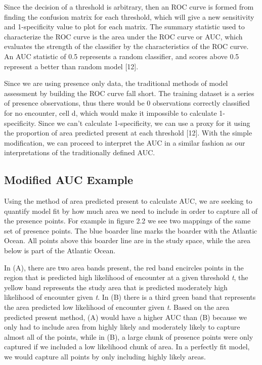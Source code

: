\noindent Since the decision of a threshold is arbitrary, then an ROC curve is formed from finding the confusion matrix for each threshold, which will give a new sensitivity and 1-specificity value to plot for each matrix. The summary statistic used to characterize the ROC curve is the area under the ROC curve or AUC, which evaluates the strength of the classifier by the characteristics of the ROC curve. An AUC statistic of 0.5 represents a random classifier, and scores above 0.5 represent a better than random model [12].    \newline

\noindent Since we are using presence only data, the traditional methods of model assessment by building the ROC curve fall short. The training dataset is a series of presence observations, thus there would be 0 observations correctly classified for no encounter, cell d,  which would make it impossible to calculate 1- specificity. Since we can't calculate 1-specificity, we can use a proxy for it using the proportion of area predicted present at each threshold [12]. With the simple modification, we can proceed to interpret the AUC in a similar fashion as our interpretations of the traditionally defined AUC. \newline

\subsection{Modified AUC Example }

Using the method of area predicted present to calculate AUC, we are seeking to quantify model fit by how much area we need to include in order to capture all of the presence points. For example in figure 2.2 we see two mappings of the same set of presence points. The blue boarder line marks the boarder with the Atlantic Ocean. All points above this boarder line are in the study space, while the area below is part of the Atlantic Ocean. \newline

\noindent In (A), there are two area bands present, the red band encircles points in the region that is predicted high likelihood of encounter at a given threshold \textit{t}, the yellow band represents the study area that is predicted moderately high likelihood of encounter given \textit{t}. In (B) there is a third green band that represents the area predicted low likelihood of encounter given \textit{t}. Based on the area predicted present method, (A) would have a higher AUC than (B) because we only had to include area from highly likely and moderately likely to capture almost all of the points, while in (B), a large chunk of presence points were only captured if we included a low likelihood chunk  of area. In a perfectly fit model, we would capture all points by only including highly likely areas. \newline

